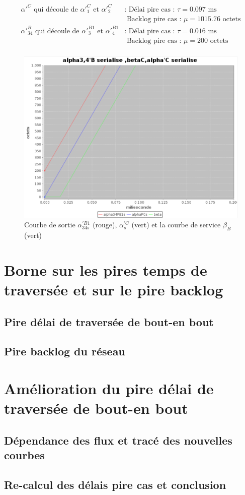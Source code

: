 \begin{align*}
\alpha'^C \text{ qui découle de } \alpha'^{C}_1 \text{ et } \alpha'^C_2
			& \text{: Délai pire cas   : }\tau = 	0.097 \text{ ms}\\
			& \text{  Backlog pire cas : }\mu = 1015.76\text{ octets}\\
\alpha'^B_{34} \text{ qui découle de } \alpha'^{B1}_3 \text{ et } \alpha'^{B1}_4
			& \text{: Délai pire cas   : }\tau = 	0.016 \text{ ms}\\
			& \text{  Backlog pire cas : }\mu = 200\text{ octets}\\
\end{align*}

\begin{figure}[!ht]
\centering%
\noindent\includegraphics[width = .5\textwidth]{./II/images/alpha_34s.png}%
\caption{\label{fig:alphaPB34}Courbe de sortie $\alpha_{34s}^{'B1}$ (rouge), $\alpha^{'C}_s$ (vert) et la courbe de service $\beta_B$ (vert)}
\end{figure}




\section{Borne sur les pires temps de traversée et sur le pire backlog}

\subsection{Pire délai de traversée de bout-en bout}

\subsection{Pire backlog du réseau}

\section{Amélioration du pire délai de traversée de bout-en bout}
\subsection{Dépendance des flux et tracé des nouvelles courbes}
\subsection{Re-calcul des délais pire cas et conclusion}